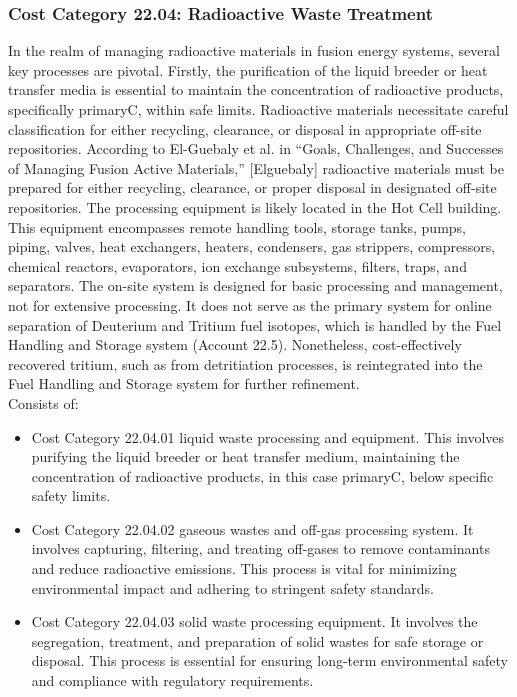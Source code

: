 
\subsubsection{Cost Category 22.04: Radioactive Waste Treatment}
In the realm of managing radioactive materials in fusion energy systems, several key processes are pivotal. Firstly, the purification of the liquid breeder or heat transfer media is essential to maintain the concentration of radioactive products, specifically primaryC, within safe limits.  Radioactive materials necessitate careful classification for either recycling, clearance, or disposal in appropriate off-site repositories.  According to El-Guebaly et al. in “Goals, Challenges, and Successes of Managing Fusion Active Materials,” [Elguebaly]
radioactive materials must be prepared for either recycling, clearance, or proper disposal in designated off-site repositories.  The processing equipment is likely located in the Hot Cell building. This equipment encompasses remote handling tools, storage tanks, pumps, piping, valves, heat exchangers, heaters, condensers, gas strippers, compressors, chemical reactors, evaporators, ion exchange subsystems, filters, traps, and separators.  The on-site system is designed for basic processing and management, not for extensive processing. It does not serve as the primary system for online separation of Deuterium and Tritium fuel isotopes, which is handled by the Fuel Handling and Storage system (Account 22.5). Nonetheless, cost-effectively recovered tritium, such as from detritiation processes, is reintegrated into the Fuel Handling and Storage system for further refinement.\\

Consists of:

\begin{itemize}
    \item Cost Category 22.04.01 liquid waste processing and equipment.  This involves purifying the liquid breeder or heat transfer medium,  maintaining the concentration of radioactive products, in this case primaryC, below specific safety limits.
    \item Cost Category 22.04.02 gaseous wastes and off-gas processing system. It involves capturing, filtering, and treating off-gases to remove contaminants and reduce radioactive emissions. This process is vital for minimizing environmental impact and adhering to stringent safety standards.
    \item Cost Category 22.04.03 solid waste processing equipment. It involves the segregation, treatment, and preparation of solid wastes for safe storage or disposal. This process is essential for ensuring long-term environmental safety and compliance with regulatory requirements.
\end{itemize}




